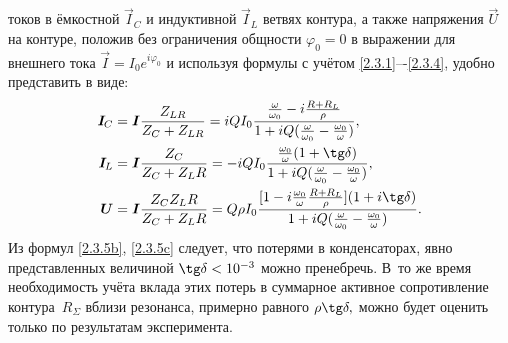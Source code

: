  токов в ёмкостной $\vec{I}_{\! C}$ и индуктивной
$\vec{I}_{\! L}$ ветвях контура, а также напряжения $\vec U$ на контуре, положив без
ограничения общности $\varphi_0=0$ в выражении для внешнего тока $\vec
I=I_0e^{i\varphi_0}$ и используя формулы  с учётом
\eqref{2.3.1}–-\eqref{2.3.4}, удобно представить в виде:
\begin{align}
			\eqmark{2.3.5a}
			\vec{I}_{\! C} &= \vec{I}\dfrac{Z_{LR}}{Z_C+Z_{LR}}=
                iQI_0\dfrac{\frac{\omega}{\omega_0}-i \frac{R+R_L}{\rho}}{%
                        1+iQ(\frac{\omega}{\omega_0}-\frac{\omega_0}{\omega})}, \\
			\eqmark{2.3.5b}
			\vec{I}_{\! L}&=\vec{I}\dfrac{Z_C}{Z_C+Z_LR}=
                -iQI_0\dfrac{\frac{\omega_0}{\omega}(1+\tg\delta)}{%
                    1+iQ(\frac{\omega}{\omega_0}-\frac{\omega_0}{\omega})}, \\
			\eqmark{2.3.5c}
			\vec U&=\vec{I}\dfrac{Z_C Z_LR}{Z_C+Z_LR}= 
                Q\rho I_0 \dfrac{[1-i\frac{\omega_0}{\omega}\frac{R+R_L}{\rho}](1+i\tg\delta)}{%
                    1+iQ(\frac{\omega}{\omega_0}-\frac{\omega_0}{\omega})}.
\end{align}
Из формул \eqref{2.3.5b}, \eqref{2.3.5c} следует, что потерями в конденсаторах,
явно представленных величиной $\tg\delta<10^{-3}$ можно пренебречь. 
В~то же время необходимость учёта вклада этих потерь в
суммарное активное сопротивление контура~$R_{\Sigma}$ 
вблизи резонанса, примерно равного $\rho\tg\delta,$ можно будет оценить только по
результатам эксперимента.

